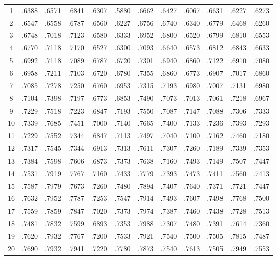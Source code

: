 \begin{table}[!htbp]
\begin{tabular}{|c*{11}{c}|}
1   & .6388 & .6571 & .6841 & .6307 & .5880 & .6662 & .6427 & .6067 & .6631 & .6227 & .6273 \\
2   & .6547 & .6558 & .6787 & .6560 & .6227 & .6756 & .6740 & .6340 & .6779 & .6468 & .6260 \\
3   & .6748 & .7018 & .7123 & .6580 & .6333 & .6952 & .6800 & .6520 & .6799 & .6810 & .6553 \\
4   & .6770 & .7118 & .7170 & .6527 & .6300 & .7093 & .6640 & .6573 & .6812 & .6843 & .6633 \\
5   & .6992 & .7118 & .7089 & .6787 & .6720 & .7301 & .6940 & .6860 & .7122 & .6910 & .7080 \\
6   & .6958 & .7211 & .7103 & .6720 & .6780 & .7355 & .6860 & .6773 & .6907 & .7017 & .6860 \\
7   & .7085 & .7278 & .7250 & .6760 & .6953 & .7315 & .7193 & .6980 & .7007 & .7131 & .6980 \\
8   & .7104 & .7398 & .7197 & .6773 & .6853 & .7490 & .7073 & .7013 & .7061 & .7218 & .6967 \\
9   & .7229 & .7518 & .7223 & .6847 & .7193 & .7550 & .7087 & .7147 & .7088 & .7306 & .7333 \\
10  & .7339 & .7685 & .7451 & .7000 & .7140 & .7665 & .7400 & .7133 & .7236 & .7393 & .7293 \\
11  & .7229 & .7552 & .7344 & .6847 & .7113 & .7497 & .7040 & .7100 & .7162 & .7460 & .7180 \\
12  & .7317 & .7545 & .7344 & .6913 & .7313 & .7611 & .7307 & .7260 & .7189 & .7339 & .7353 \\
13  & .7384 & .7598 & .7606 & .6873 & .7373 & .7638 & .7160 & .7493 & .7149 & .7507 & .7447 \\
14  & .7531 & .7919 & .7767 & .7160 & .7433 & .7779 & .7393 & .7473 & .7411 & .7560 & .7413 \\
15  & .7587 & .7979 & .7673 & .7260 & .7480 & .7894 & .7407 & .7640 & .7371 & .7721 & .7447 \\
16  & .7632 & .7952 & .7787 & .7253 & .7547 & .7914 & .7493 & .7607 & .7498 & .7768 & .7500 \\
17  & .7559 & .7859 & .7847 & .7020 & .7373 & .7974 & .7387 & .7460 & .7438 & .7728 & .7513 \\
18  & .7481 & .7832 & .7599 & .6893 & .7353 & .7988 & .7307 & .7480 & .7391 & .7614 & .7360 \\
19  & .7620 & .7932 & .7767 & .7200 & .7533 & .7921 & .7540 & .7500 & .7505 & .7815 & .7487 \\
20  & .7690 & .7932 & .7941 & .7220 & .7780 & .7873 & .7540 & .7613 & .7505 & .7949 & .7553 \\

\end{tabular}
\end{table}
